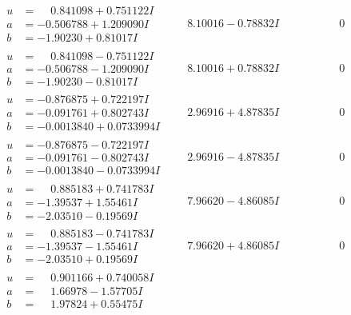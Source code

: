 \documentclass[1p]{elsarticle_modified}
\theoremstyle{definition}
\begin{document}
$$\begin{array}{c|c|c}
\begin{aligned}
u &= \phantom{-}0.841098 + 0.751122 I \\
a &= -0.506788 + 1.209090 I \\
b &= -1.90230 + 0.81017 I\end{aligned}
 & \phantom{-}8.10016 - 0.78832 I & \phantom{-0.000000 } 0 \\ \hline\begin{aligned}
u &= \phantom{-}0.841098 - 0.751122 I \\
a &= -0.506788 - 1.209090 I \\
b &= -1.90230 - 0.81017 I\end{aligned}
 & \phantom{-}8.10016 + 0.78832 I & \phantom{-0.000000 } 0 \\ \hline\begin{aligned}
u &= -0.876875 + 0.722197 I \\
a &= -0.091761 + 0.802743 I \\
b &= -0.0013840 + 0.0733994 I\end{aligned}
 & \phantom{-}2.96916 + 4.87835 I & \phantom{-0.000000 } 0 \\ \hline\begin{aligned}
u &= -0.876875 - 0.722197 I \\
a &= -0.091761 - 0.802743 I \\
b &= -0.0013840 - 0.0733994 I\end{aligned}
 & \phantom{-}2.96916 - 4.87835 I & \phantom{-0.000000 } 0 \\ \hline\begin{aligned}
u &= \phantom{-}0.885183 + 0.741783 I \\
a &= -1.39537 + 1.55461 I \\
b &= -2.03510 - 0.19569 I\end{aligned}
 & \phantom{-}7.96620 - 4.86085 I & \phantom{-0.000000 } 0 \\ \hline\begin{aligned}
u &= \phantom{-}0.885183 - 0.741783 I \\
a &= -1.39537 - 1.55461 I \\
b &= -2.03510 + 0.19569 I\end{aligned}
 & \phantom{-}7.96620 + 4.86085 I & \phantom{-0.000000 } 0 \\ \hline\begin{aligned}
u &= \phantom{-}0.901166 + 0.740058 I \\
a &= \phantom{-}1.66978 - 1.57705 I \\
b &= \phantom{-}1.97824 + 0.55475 I\end{aligned}

\end{array}$$
\end{document}
